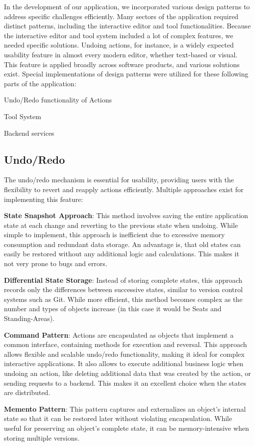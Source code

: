 In the development of our application, we incorporated various design patterns to address specific challenges efficiently. Many sectors of the application required distinct patterns, including the interactive editor and tool functionalities. Because the interactive editor and tool system included a lot of complex features, we needed specific solutions. Undoing actions, for instance, is a widely expected usability feature in almost every modern editor, whether text-based or visual. This feature is applied broadly across software products, and various solutions exist. Special implementations of design patterns were utilized for these following parts of the application:
\begin{compactitem}
\item Undo/Redo functionality of Actions
\item Tool System
\item Backend services
\end{compactitem}

\subsection{Undo/Redo}

The undo/redo mechanism is essential for usability, providing users with the flexibility to revert and reapply actions efficiently. Multiple approaches exist for implementing this feature:

\begin{compactenum}
\item \textbf{State Snapshot Approach}: This method involves saving the entire application state at each change and reverting to the previous state when undoing. While simple to implement, this approach is inefficient due to excessive memory consumption and redundant data storage. An advantage is, that old states can easily be restored without any additional logic and calculations. This makes it not very prone to bugs and errors.
\item \textbf{Differential State Storage}: Instead of storing complete states, this approach records only the differences between successive states, similar to version control systems such as Git. While more efficient, this method becomes complex as the number and types of objects increase (in this case it would be Seats and Standing-Areas).
\item \textbf{Command Pattern}: Actions are encapsulated as objects that implement a common interface, containing methods for execution and reversal. This approach allows flexible and scalable undo/redo functionality, making it ideal for complex interactive applications. It also allows to execute additional business logic when undoing an action, like deleting additional data that was created by the action, or sending requests to a backend. This makes it an excellent choice when the states are distributed.
\item \textbf{Memento Pattern}: This pattern captures and externalizes an object's internal state so that it can be restored later without violating encapsulation. While useful for preserving an object's complete state, it can be memory-intensive when storing multiple versions.
\end{compactenum}

